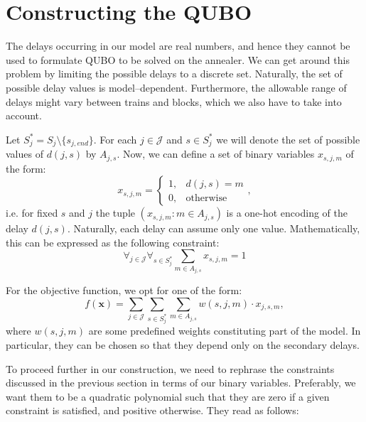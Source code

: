 \section{Constructing the QUBO}
The delays occurring in our model are real numbers, and hence they cannot be used
to formulate QUBO to be solved on the annealer. We can get around this problem by limiting
the possible delays to a discrete set. Naturally, the set of possible delay values is
model--dependent. Furthermore, the allowable range of delays might vary between trains and blocks,
which we also have to take into account.

Let $S^{*}_{j}=  S_{j} \setminus \{s_{j,end}\}$. For each $j \in \mathcal{J}$ and $s \in S^{*}_{j}$
we will denote the set of possible values of $d(j, s)$ by $A_{j, s}$. Now, we can define a set of binary variables $x_{s,j,m}$  of the form:
\begin{equation}
  x_{s,j,m} = \begin{cases}
                1, & d(j, s) = m\\
                0, & \mbox{otherwise}
\end{cases},
\end{equation}
i.e. for fixed $s$ and $j$ the tuple $(x_{s,j,m}\colon m \in A_{j,s})$  is a one-hot encoding of
the  delay $d(j,s)$. Naturally, each delay can assume only one value. Mathematically, this
can be expressed as the following constraint:
\begin{equation}
  \forall_{j \in \mathcal{J}}\forall_{s \in S^{*}_{j}} \sum_{m \in A_{j, s}} x_{s,j,m} = 1
\end{equation}

For the objective function, we opt for one of the form:
\begin{equation}
  \label{eq:onehot}
f(\mathbf{x}) = \sum_{j \in \mathcal{J}}\sum_{s \in S^{*}_{j}}\sum_{m \in A_{j,s}} w(s,j,m) \cdot x_{j,s,m},
\end{equation}
where $w(s,j,m)$ are some predefined weights constituting part of the model. In particular, they
can be chosen so that they depend only on the secondary delays.

To proceed further in our construction, we need to rephrase the constraints discussed in the
previous section in terms of our binary variables. Preferably, we want them to be a quadratic
polynomial such that they are zero if a given constraint is satisfied, and positive otherwise.
They read as follows:\\
